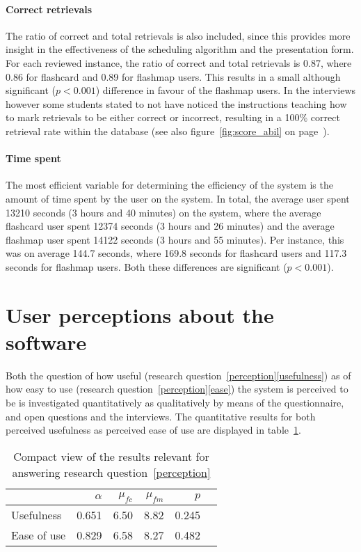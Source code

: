 \paragraph{Correct retrievals} The ratio of correct and total retrievals is also included, since this provides more insight in the effectiveness of the scheduling algorithm and the presentation form. For each reviewed instance, the ratio of correct and total retrievals is 0.87, where 0.86 for flashcard and 0.89 for flashmap users. This results in a small although significant ($p<0.001$) difference in favour of the flashmap users. In the interviews however some students stated to not have noticed the instructions teaching how to mark retrievals to be either correct or incorrect, resulting in a 100\% correct retrieval rate within the database (see also figure~\ref{fig:score_abil} on page~\pageref{fig:score_abil}).

\paragraph{Time spent} The most efficient variable for determining the efficiency of the system is the amount of time spent by the user on the system. In total, the average user spent 13210 seconds (3 hours and 40 minutes) on the system, where the average flashcard user spent 12374 seconds (3 hours and 26 minutes) and the average flashmap user spent 14122 seconds (3 hours and 55 minutes). Per instance, this was on average 144.7 seconds, where 169.8 seconds for flashcard users and 117.3 seconds for flashmap users. Both these differences are significant ($p<0.001$).

\section{User perceptions about the software}

Both the question of how useful (research question~\ref{perception}\ref{usefulness}) as of how easy to use (research question~\ref{perception}\ref{ease}) the system is perceived to be is investigated quantitatively as qualitatively by means of the questionnaire, and open questions and the interviews. The quantitative results for both perceived usefulness as perceived ease of use are displayed in table~\ref{tab:perception}.

\begin{table}
    \centering
    \begin{tabular}{lrrrrr}
        \toprule
        & $\alpha$ & $\mu_{fc}$ & $\mu_{fm}$ & $p$ \\
        \midrule
        Usefulness & 0.651 & 6.50 & 8.82 & 0.245 \\
        Ease of use & 0.829 & 6.58 & 8.27 & 0.482 \\
        \bottomrule
    \end{tabular}
    \caption{Compact view of the results relevant for answering research question~\protect\ref{perception}}
    \label{tab:perception}
\end{table}

